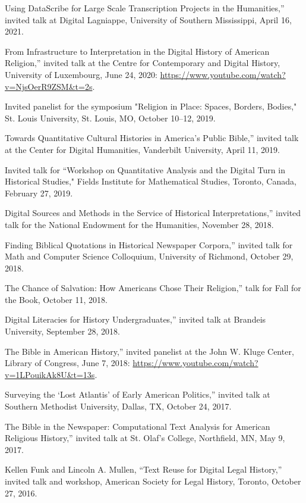 \documentclass[11pt]{article}
\begin{document}
\noindent{}Using DataScribe for Large Scale Transcription Projects in the Humanities,'' invited talk at Digital Lagniappe, University of Southern Mississippi, April 16, 2021.

\noindent{}From Infrastructure to Interpretation in the Digital History of American Religion,'' invited talk at the Centre for Contemporary and Digital History, University of Luxembourg, June 24, 2020: \url{https://www.youtube.com/watch?v=NjsOerR9ZSM&t=2s}.

Invited panelist for the symposium "Religion in Place: Spaces, Borders, Bodies," St. Louis University, St. Louis, MO, October 10--12, 2019.

\noindent{}Towards Quantitative Cultural Histories in America's Public Bible,'' invited talk at the Center for Digital Humanities, Vanderbilt University, April 11, 2019.

Invited talk for ``Workshop on Quantitative Analysis and the Digital Turn in Historical Studies," Fields Institute for Mathematical Studies, Toronto, Canada, February 27, 2019.

\noindent{}Digital Sources and Methods in the Service of Historical Interpretations,'' invited talk for the National Endowment for the Humanities, November 28, 2018.

\noindent{}Finding Biblical Quotations in Historical Newspaper Corpora,'' invited talk for Math and Computer Science Colloquium, University of Richmond, October 29, 2018.

\noindent{}The Chance of Salvation: How Americans Chose Their Religion,'' talk for Fall for the Book, October 11, 2018.

\noindent{}Digital Literacies for History Undergraduates,'' invited talk at Brandeis University, September 28, 2018.

\noindent{}The Bible in American History,'' invited panelist at the John W. Kluge Center, Library of Congress, June 7, 2018: \url{https://www.youtube.com/watch?v=1LPouikAk8U&t=13s}.

\noindent{}Surveying the `Lost Atlantis' of Early American Politics,'' invited talk at Southern Methodist University, Dallas, TX, October 24, 2017.

\noindent{}The Bible in the Newspaper: Computational Text Analysis for American Religious History,'' invited talk at St. Olaf's College, Northfield, MN, May 9, 2017.

Kellen Funk and Lincoln A. Mullen, ``Text Reuse for Digital Legal History,'' invited talk and workshop, American Society for Legal History, Toronto, October 27, 2016.
\end{document}
